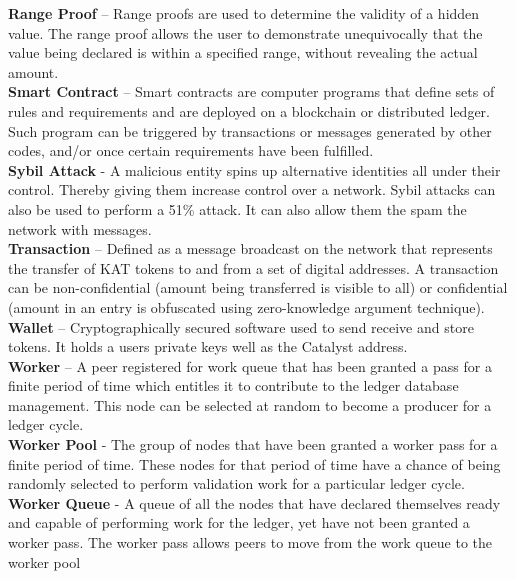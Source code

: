 \textbf{Range Proof} – Range proofs are used to determine the validity of a hidden value. The range proof allows the user to demonstrate unequivocally that the value being declared is within a specified range, without revealing the actual amount. \\

\textbf{Smart Contract} – Smart contracts are computer programs that define sets of rules and requirements and are deployed on a blockchain or distributed ledger. Such program can be triggered by transactions or messages generated by other codes, and/or once certain requirements have been fulfilled. \\

\textbf{Sybil Attack} - A malicious entity spins up alternative identities all under their control. Thereby giving them increase control over a network. Sybil attacks can also be used to perform a 51\% attack. It can also allow them the spam the network with messages.  \\

\textbf{Transaction} – Defined as a message broadcast on the network that represents the transfer of KAT tokens to and from a set of digital addresses. A transaction can be non-confidential (amount being transferred is visible to all) or confidential (amount in an entry is obfuscated using zero-knowledge argument technique). \\

\textbf{Wallet} – Cryptographically secured software used to send receive and store tokens. It holds a users private keys well as the Catalyst address.\\

\textbf{Worker} – A peer registered for work queue that has been granted a pass for a finite period of time which entitles it to contribute to the ledger database management. This node can be selected at random to become a producer for a ledger cycle. \\

\textbf{Worker Pool} - The group of nodes that have been granted a worker pass for a finite period of time. These nodes for that period of time have a chance of being randomly selected to perform validation work for a particular ledger cycle. \\

\textbf{Worker Queue} - A queue of all the nodes that have declared themselves ready and capable of performing work for the ledger, yet have not been granted a worker pass. The worker pass allows peers to move from the work queue to the worker pool\\


